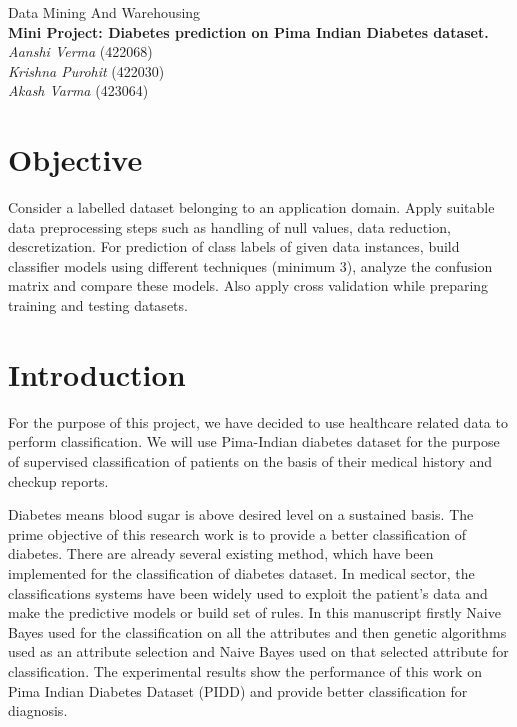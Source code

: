 \documentclass{article}
\begin{document}
\begin{center}
	\vspace*{100px}
	\Huge Data Mining And Warehousing \\
	\vspace{60px}
	\LARGE \textbf{Mini Project: Diabetes prediction on Pima Indian Diabetes dataset.}\\
	\vspace{100px}
	\textit{Aanshi Verma}  (422068) \\
	\textit{Krishna Purohit} (422030) \\
	\textit {Akash Varma} (423064) \\
\end{center}
\newpage
\normalsize

\section{Objective}

Consider a labelled dataset belonging to an application domain. Apply suitable data preprocessing steps such as handling of null values, data reduction, descretization. For prediction of class labels of given data instances, build classifier models using different techniques (minimum 3), analyze the confusion matrix and compare these models. Also apply cross validation while preparing training and testing datasets.


\section{Introduction}

For the purpose of this project, we have decided to use healthcare related data to perform classification. We will use Pima-Indian diabetes dataset for the purpose of supervised classification of patients on the basis of their medical history and checkup reports.

\par Diabetes means blood sugar is above desired level on a sustained basis. The prime objective of this research work is to provide a better classification of  diabetes. There are already several existing method, which have been implemented for the classification of  diabetes dataset. In medical sector, the classifications systems have been widely used to exploit the patient’s data and make the predictive models or build set of  rules. In this manuscript firstly Naive Bayes used for the classification on all the attributes and then genetic algorithms used as an attribute selection and Naive Bayes used on that selected attribute for classification. The experimental results show the performance of  this work on Pima Indian Diabetes Dataset (PIDD) and provide better classification for diagnosis.
\end{document}
